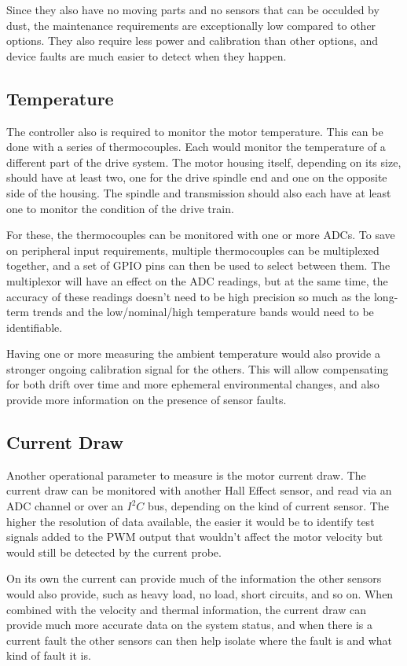 \documentclass{article}
\begin{document}
Since they also have no moving parts and no sensors that can be
occulded by dust, the maintenance requirements are exceptionally low
compared to other options. They also require less power and
calibration than other options, and device faults are much easier to
detect when they happen.

\subsection{Temperature}

The controller also is required to monitor the motor temperature.
This can be done with a series of thermocouples. Each would monitor
the temperature of a different part of the drive system. The motor
housing itself, depending on its size, should have at least two, one
for the drive spindle end and one on the opposite side of the housing.
The spindle and transmission should also each have at least one to
monitor the condition of the drive train.

For these, the thermocouples can be monitored with one or more ADCs.
To save on peripheral input requirements, multiple thermocouples can
be multiplexed together, and a set of GPIO pins can then be used to
select between them. The multiplexor will have an effect on the ADC
readings, but at the same time, the accuracy of these readings doesn’t
need to be high precision so much as the long-term trends and the
low/nominal/high temperature bands would need to be identifiable.

Having one or more measuring the ambient temperature would also
provide a stronger ongoing calibration signal for the others.
This will allow compensating for both drift over time and more
ephemeral environmental changes, and also provide more information on
the presence of sensor faults.

\subsection{Current Draw}

Another operational parameter to measure is the motor current draw.
The current draw can be monitored with another Hall Effect sensor, and
read via an ADC channel or over an $I^2C$ bus, depending on the kind
of current sensor. The higher the resolution of data available, the
easier it would be to identify test signals added to the PWM output
that wouldn’t affect the motor velocity but would still be detected by
the current probe.

On its own the current can provide much of the information the other
sensors would also provide, such as heavy load, no load, short
circuits, and so on. When combined with the velocity and thermal
information, the current draw can provide much more accurate data on
the system status, and when there is a current fault the other sensors
can then help isolate where the fault is and what kind of fault it is.
\end{document}
